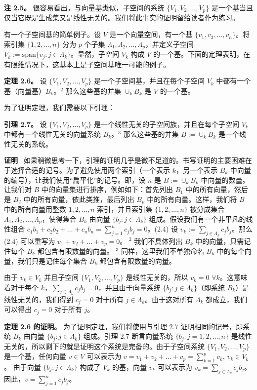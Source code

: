 \textbf{注 2.5。} 很容易看出，与向量基类似，子空间的系统 $\{V_1, V_2, \dots, V_p\}$ 是一个基当且仅当它既是生成集又是线性无关的。我们将此事实的证明留给读者作为练习。

有一个子空间基的简单例子。设 $V$ 是一个向量空间，有一个基 $\{v_1, v_2, \dots, v_n\}$。将索引集 $\{1, 2, \dots, n\}$ 分为 $p$ 个子集 $\Lambda_1, \Lambda_2, \dots, \Lambda_p$，并定义子空间 $V_k := \text{span}\{v_j : j \in \Lambda_k\}$。显然，子空间 $V_k$ 构成 $V$ 的一个基。下面的定理表明，在有限维情况下，这基本上是子空间基唯一可能的例子。

\textbf{定理 2.6。} 设 $\{V_1, V_2, \dots, V_p\}$ 是一个子空间基，并且在每个子空间 $V_k$ 中都有一个基（向量基）$B_k$。$^2$ 那么这些基的并集 $\cup_k B_k$ 是 $V$ 的一个基。

为了证明定理，我们需要以下引理：

\textbf{引理 2.7。} 设 $\{V_1, V_2, \dots, V_p\}$ 是一个线性无关的子空间族，并且在每个子空间 $V_k$ 中都有一个线性无关的向量系统 $B_k$。$^3$ 那么这些基的并集 $B := \cup_k B_k$ 是一个线性无关的系统。

\textbf{证明}~ 如果稍微思考一下，引理的证明几乎是微不足道的。书写证明的主要困难在于选择合适的记号。为了避免使用两个索引（一个表示 $k$，另一个表示 $B_k$ 中向量的编号），让我们使用“扁平化”的记号。即，设 $n$ 是 $B := \cup_k B_k$ 中向量的数量。让我们对 $B$ 中的向量集进行排序，例如如下：首先列出 $B_1$ 中的所有向量，然后是 $B_2$ 中的所有向量，依此类推，最后列出 $B_p$ 中的所有向量。这样，我们将 $B$ 中的所有向量用整数 $1, 2, \dots, n$ 索引，并且索引集 $\{1, 2, \dots, n\}$ 被分成集合 $\Lambda_1, \Lambda_2, \dots, \Lambda_p$，使得集合 $B_k$ 由向量 $\{b_j : j \in \Lambda_k\}$ 组成。假设我们有一个非平凡的线性组合
$c_1 b_1 + c_2 b_2 + \dots + c_n b_n = \sum_{j=1}^n c_j b_j = 0$。(2.4)
设 $v_k := \sum_{j \in \Lambda_k} c_j b_j$。那么 (2.4) 可以重写为
$v_1 + v_2 + \dots + v_p = 0$。
$^2$ 我们不具体列出 $B_k$ 中的向量，只需记住每个 $B_k$ 都包含有限数量的向量。
$^3$ 同样，这里我们不单独命名 $B_k$ 中的每个向量，我们只是记住每个集合 $B_k$ 都包含有限数量的向量。



由于 $v_k \in V_k$ 并且子空间 $\{V_1, V_2, \dots, V_p\}$ 是线性无关的，所以 $v_k = 0$ $\forall k$。这意味着对于每个 $k$，$\sum_{j \in \Lambda_k} c_j b_j = 0$，并且由于向量系统 $\{b_j : j \in \Lambda_k\}$（即系统 $B_k$）是线性无关的，我们得到 $c_j = 0$ 对于所有 $j \in \Lambda_k$。由于这对所有 $\Lambda_k$ 都成立，我们可以得出 $c_j = 0$ 对于所有 $j$。

\textbf{定理 2.6 的证明。} 为了证明定理，我们将使用与引理 2.7 证明相同的记号，即系统 $B_k$ 由向量 $\{b_j : j \in \Lambda_k\}$ 组成。引理 2.7 断言向量系统 $\{b_j : j = 1, 2, \dots, n\}$ 是线性无关的，所以剩下的就是证明这个系统是完备的。由于子空间系统 $\{V_1, V_2, \dots, V_p\}$ 是一个基，任何向量 $v \in V$ 可以表示为
$v = v_1 + v_2 + \dots + v_p = \sum_{k=1}^p v_k$, $v_k \in V_k$。
由于向量 $\{b_j : j \in \Lambda_k\}$ 构成了 $V_k$ 的基，向量 $v_k$ 可以表示为 $v_k = \sum_{j \in \Lambda_k} c_j b_j$。因此，$v = \sum_{j=1}^n c_j b_j$。

